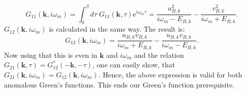 \begin{equation}
G_{11}(\mathbf{k},i\omega_m) = \int_0^\beta d\tau \; G_{11}(\mathbf{k},\tau) \text{e}^{i\omega_m\tau} = \frac{u_{B,k}^2}{i\omega_m-E_{B,k}}-\frac{v_{B,k}^2}{i\omega_m+E_{B,k}}. 
\end{equation}
$G_{12}(\mathbf{k},i\omega_m)$ is calculated in the same way. The result is: 
\begin{equation}
G_{12}(\mathbf{k},i\omega_m)= \frac{u_{B,k}v_{B,k}}{i\omega_m+E_{B,k}}-\frac{u_{B,k}v_{B,k}}{i\omega_m-E_{B,k}}. 
\end{equation}
Now using that this is even in $\mathbf{k}$ and $i\omega_m$ and the relation $G_{21}(\mathbf{k},\tau)=G_{12}^*(-\mathbf{k},-\tau)$, one can easily show, that $G_{21}(\mathbf{k},i\omega_m) = G_{12}(\mathbf{k},i\omega_m)$. Hence, the above expression is valid for both anomalous Green's functions. This ends our Green's function prerequisite.